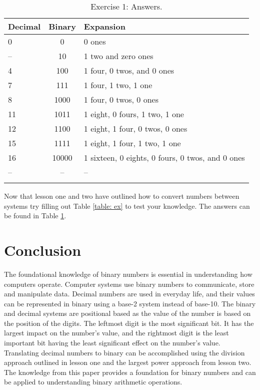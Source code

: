 \documentclass[twocolumn, 10pt]{article}
\begin{document}
\begin{table}[ht]
\centering
\caption{Exercise 1: Answers.}
\begin{tabular}[t]{lcl}
\hline
Decimal&Binary&Expansion\\
\hline
0 &0&0 ones\\
-- &10&1 two and zero ones\\
4 &100&1 four, 0 twos, and 0 ones\\
7 &111&1 four, 1 two, 1 one\\
8 &1000&1 four, 0 twos, 0 ones\\
11 &1011&1 eight, 0 fours, 1 two, 1 one\\
12 &1100&1 eight, 1 four, 0 twos, 0 ones\\
15 &1111&1 eight, 1 four, 1 two, 1 one\\
16 &10000&\multirow{1}{5.5cm}{1 sixteen, 0 eights, 0 fours, 0 twos, and 0 ones} \\
--&--&--\\

\hline
\label{table: ans}
\end{tabular}
\end{table}%

Now that lesson one and two have outlined how to convert numbers between systems try filling out Table \ref{table: ex} to test your knowledge. The answers can be found in Table \ref{table: ans}.

\section{Conclusion}
The foundational knowledge of binary numbers is essential in understanding how computers operate. Computer systems use binary numbers to communicate, store and manipulate data. Decimal numbers are used in everyday life, and their values can be represented in binary using a base-2 system instead of base-10. The binary and decimal systems are positional based as the value of the number is based on the position of the digits. The leftmost digit is the most significant bit. It has the largest impact on the number's value, and the rightmost digit is the least important bit having the least significant effect on the number's value. Translating decimal numbers to binary can be accomplished using the division approach outlined in lesson one and the largest power approach from lesson two. The knowledge from this paper provides a foundation for binary numbers and can be applied to understanding binary arithmetic operations.  
\end{document}
